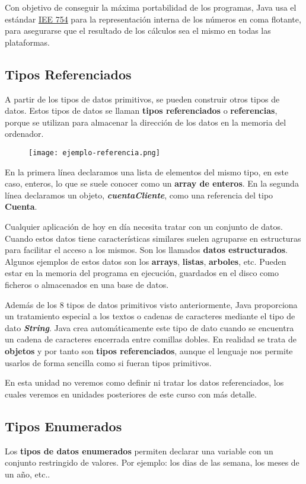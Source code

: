 Con objetivo de conseguir la máxima portabilidad de los programas, Java usa el estándar \href{https://grouper.ieee.org/groups/msc/ANSI_IEEE-Std-754-2019/}{IEE 754} para la representación interna de los números en coma flotante, para asegurarse que el resultado de los cálculos sea el mismo en todas las plataformas.

\subsection{Tipos Referenciados}
A partir de los tipos de datos primitivos, se pueden construir otros tipos de datos. Estos tipos de datos se llaman \textbf{tipos referenciados} o \textbf{referencias}, porque se utilizan para almacenar la dirección de los datos en la memoria del ordenador.

\begin{figure}[H]
    \texttt{[image: ejemplo-referencia.png]}
\end{figure}

En la primera línea declaramos una lista de elementos del mismo tipo, en este caso, enteros, lo que se suele conocer como un \textbf{array de enteros}. En la segunda línea declaramos un objeto, \textbf{\textit{cuentaCliente}}, como una referencia del tipo \textbf{Cuenta}.

Cualquier aplicación de hoy en día necesita tratar con un conjunto de datos. Cuando estos datos tiene características similares suelen agruparse en estructuras para facilitar el acceso a los mismos. Son los llamados \textbf{datos estructurados}. Algunos ejemplos de estos datos son los \textbf{arrays}, \textbf{listas}, \textbf{arboles}, etc. Pueden estar en la memoria del programa en ejecución,	guardados en el disco como ficheros o almacenados en una base de datos.

Además de los 8 tipos de datos primitivos visto anteriormente, Java proporciona un tratamiento especial a los textos o cadenas de caracteres mediante el tipo de dato \textbf{\textit{String}}. Java crea automáticamente este tipo de dato cuando se encuentra un cadena de caracteres encerrada entre comillas dobles. En realidad se trata de \textbf{objetos} y por tanto son \textbf{tipos referenciados}, aunque el lenguaje nos permite usarlos de forma sencilla como si fueran tipos primitivos.

En esta unidad no veremos como definir ni tratar los datos referenciados, los cuales veremos en unidades posteriores de este curso con más detalle.

\subsection{Tipos Enumerados}
Los \textbf{tipos de datos enumerados} permiten declarar una variable con un conjunto restringido de valores. Por ejemplo: los dias de las semana, los meses de un año, etc..

